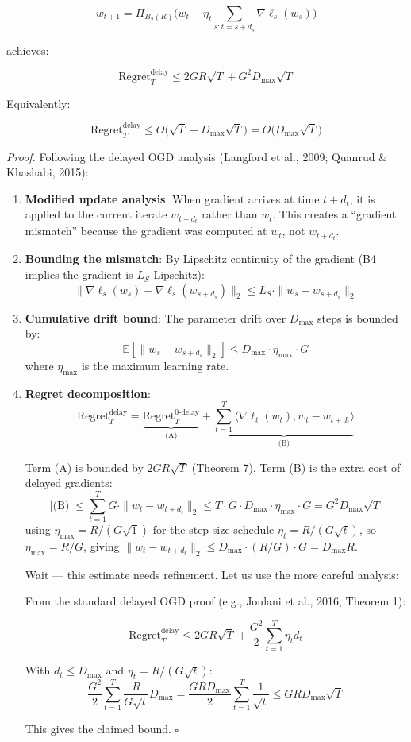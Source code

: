 \documentclass[
  12pt,
]{ctexart}
\begin{document}
\[w_{t+1} = \Pi_{B_2(R)}\bigl( w_t - \eta_t \sum_{s: t = s + d_s} \nabla \ell_s(w_s) \bigr)\]

achieves:

\[\boxed{\;\text{Regret}_T^{\text{delay}} \leq 2GR\sqrt{T} + G^2 D_{\max} \sqrt{T}\;}\]

Equivalently:

\[\text{Regret}_T^{\text{delay}} \leq O\bigl( \sqrt{T} + D_{\max} \sqrt{T} \bigr) = O\bigl( D_{\max} \sqrt{T} \bigr)\]

\emph{Proof.} Following the delayed OGD analysis (Langford et al., 2009;
Quanrud \& Khashabi, 2015):

\begin{enumerate}
\def\labelenumi{\arabic{enumi}.}
\item
  \textbf{Modified update analysis}: When gradient arrives at time
  \(t + d_t\), it is applied to the current iterate \(w_{t+d_t}\) rather
  than \(w_t\). This creates a ``gradient mismatch'' because the
  gradient was computed at \(w_t\), not \(w_{t+d_t}\).
\item
  \textbf{Bounding the mismatch}: By Lipschitz continuity of the
  gradient (B4 implies the gradient is \(L_S\)-Lipschitz):
  \[\|\nabla \ell_s(w_s) - \nabla \ell_s(w_{s+d_s})\|_2 \leq L_S \cdot \|w_s - w_{s+d_s}\|_2\]
\item
  \textbf{Cumulative drift bound}: The parameter drift over \(D_{\max}\)
  steps is bounded by:
  \[\mathbb{E}[\|w_s - w_{s+d_s}\|_2] \leq D_{\max} \cdot \eta_{\max} \cdot G\]
  where \(\eta_{\max}\) is the maximum learning rate.
\item
  \textbf{Regret decomposition}:
  \[\text{Regret}_T^{\text{delay}} = \underbrace{\text{Regret}_T^{0\text{-delay}}}_{\text{(A)}} + \underbrace{\sum_{t=1}^T \langle \nabla \ell_t(w_t), w_t - w_{t+d_t} \rangle}_{\text{(B)}}\]

  Term (A) is bounded by \(2GR\sqrt{T}\) (Theorem 7). Term (B) is the
  extra cost of delayed gradients:
  \[|\text{(B)}| \leq \sum_{t=1}^T G \cdot \|w_t - w_{t+d_t}\|_2 \leq T \cdot G \cdot D_{\max} \cdot \eta_{\max} \cdot G = G^2 D_{\max} \sqrt{T}\]
  using \(\eta_{\max} = R/(G\sqrt{1})\) for the step size schedule
  \(\eta_t = R/(G\sqrt{t})\), so \(\eta_{\max} = R/G\), giving
  \(\|w_t - w_{t+d_t}\|_2 \leq D_{\max} \cdot (R/G) \cdot G = D_{\max} R\).

  Wait --- this estimate needs refinement. Let us use the more careful
  analysis:

  From the standard delayed OGD proof (e.g., Joulani et al., 2016,
  Theorem 1):

  \[\text{Regret}_T^{\text{delay}} \leq 2GR\sqrt{T} + \frac{G^2}{2} \sum_{t=1}^T \eta_t d_t\]

  With \(d_t \leq D_{\max}\) and \(\eta_t = R/(G\sqrt{t})\):
  \[\frac{G^2}{2} \sum_{t=1}^T \frac{R}{G\sqrt{t}} D_{\max} = \frac{G R D_{\max}}{2} \sum_{t=1}^T \frac{1}{\sqrt{t}} \leq G R D_{\max} \sqrt{T}\]

  This gives the claimed bound. \(\square\)
\end{enumerate}
\end{document}
